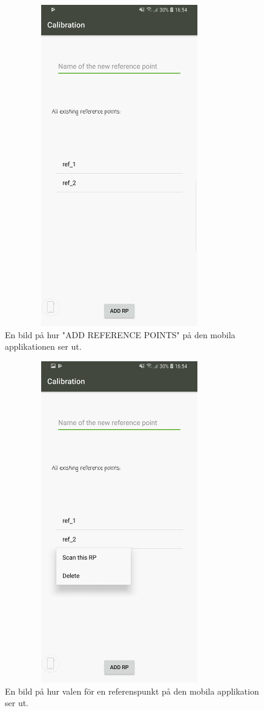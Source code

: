 \documentclass[swedish, a4paper,12pt]{article}
\begin{document}
\begin{figure}[H]
  \centering
  \includegraphics[width=10cm, height=14cm]{media/mob_scan_ref.jpg}
  \caption{En bild på hur "ADD REFERENCE POINTS" på den mobila applikationen ser ut.}
  \label{fig:mob_scan_ref}
\end{figure}

\begin{figure}[H]
  \centering
  \includegraphics[width=10cm, height=14cm]{media/mob_scan_ref_option.jpg}
  \caption{En bild på hur valen för en referenspunkt på den mobila applikation ser ut.}
  \label{fig:mob_scan_ref_option}
\end{figure}
\end{document}
